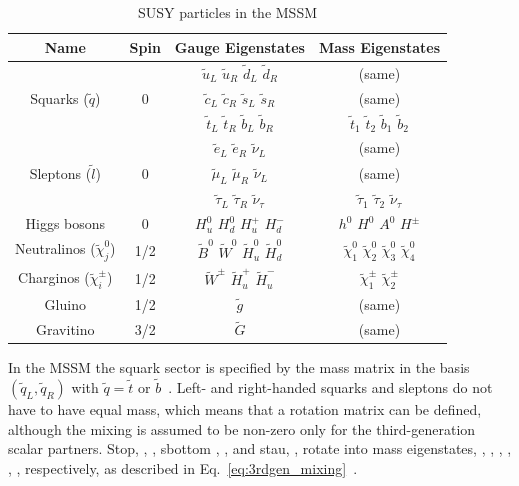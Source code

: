 				\begin{table}[!htb]\centering\caption{SUSY particles in the MSSM}							
					\begin{tabular}{|c|c|c|c|}
						\hline
						\textbf{Name} & \textbf{Spin} & \textbf{Gauge Eigenstates} & \textbf{Mass Eigenstates} \\ \hline \hline
						
						\multirow{3}{*}{Squarks ($\tilde{q}$)} & \multirow{3}{*}{0} 
						& $\tilde{u}_L$ $\tilde{u}_R$ $\tilde{d}_L$ $\tilde{d}_R$ & (same) \\
						& & $\tilde{c}_L$ $\tilde{c}_R$ $\tilde{s}_L$ $\tilde{s}_R$ & (same) \\
						& & $\tilde{t}_L$ $\tilde{t}_R$ $\tilde{b}_L$ $\tilde{b}_R$ & $\tilde{t}_1$ $\tilde{t}_2$ $\tilde{b}_1$ $\tilde{b}_2$ \\ \hline

						\multirow{3}{*}{Sleptons ($\tilde{l}$)} & \multirow{3}{*}{0} 
						& $\tilde{e}_L$ $\tilde{e}_R$ $\tilde{\nu}_L$ & (same) \\
						& & $\tilde{\mu}_L$ $\tilde{\mu}_R$ $\tilde{\nu}_L$ & (same) \\ 
						& & $\tilde{\tau}_L$ $\tilde{\tau}_R$ $\tilde{\nu}_{\tau}$ & $\tilde{\tau}_1$ $\tilde{\tau}_2$ $\tilde{\nu}_{\tau}$ \\ \hline
						
						Higgs bosons & 0 & $H_u^0$ $H_d^0$ $H_u^+$ $H_d^-$ & $h^0$ $H^0$ $A^0$ $H^{\pm}$ \\ \hline 

						Neutralinos ($\tilde{\chi}_j^0$)   & 1/2 & $\tilde{B}^0$ $\tilde{W}^0$ $\tilde{H}_u^0$ $\tilde{H}_d^0$ & $\tilde{\chi}_1^0$ $\tilde{\chi}_2^0$ $\tilde{\chi}_3^0$ $\tilde{\chi}_4^0$\\
						Charginos ($\tilde{\chi}_i^{\pm}$) & 1/2 & $\tilde{W}^{\pm}$ $\tilde{H}_u^+$ $\tilde{H}_u^-$ & $\tilde{\chi}_1^{\pm}$ $\tilde{\chi}_2^{\pm}$ \\ \hline

						Gluino & 1/2 & $\tilde{g}$ & (same) \\
						Gravitino & 3/2 & $\tilde{G}$ & (same) \\ \hline					
					\end{tabular}						
				\label{tab:MSSM_particles} 
				\end{table}


				In the MSSM the squark sector is specified by the mass matrix in the basis $(\tilde{q}_L, \tilde{q}_R)$ with $\tilde{q} = \tilde{t}$ or $\tilde{b}$~\cite{Haber:1984rc}. Left- and right-handed squarks and sleptons do not have to have equal mass, which means that a rotation matrix can be defined, although the mixing is assumed to be non-zero only for the third-generation scalar partners. Stop, \stopL, \stopR, sbottom \sbottomL, \sbottomR, and stau, \stauL, \stauR rotate into mass eigenstates, \stopone, \stoptwo, \sbottomone, \sbottomtwo, \stauone, \stautwo, respectively, as described in Eq.~\ref{eq:3rdgen_mixing}~\cite{Hidaka:2000cm}. %

